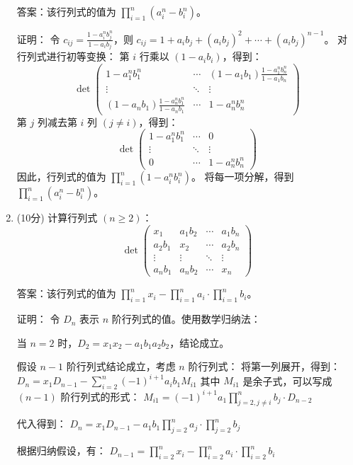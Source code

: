 \documentclass[a4paper,12pt]{article}
\begin{document}
\begin{enumerate}[leftmargin=*]
    答案：该行列式的值为 $\prod_{i=1}^n (a_i^n - b_i^n)$。
    
    证明：
    令 $c_{ij} = \frac{1-a_i^nb_j^n}{1-a_ib_j}$，则 $c_{ij} = 1 + a_ib_j + (a_ib_j)^2 + \cdots + (a_ib_j)^{n-1}$。
    对行列式进行初等变换：
    第 $i$ 行乘以 $(1-a_ib_i)$，得到：
    \[
    \det\begin{pmatrix}
    1-a_1^nb_1^n & \cdots & (1-a_1b_1)\frac{1-a_1^nb_n^n}{1-a_1b_n} \\
    \vdots & \ddots & \vdots \\
    (1-a_nb_1)\frac{1-a_n^nb_1^n}{1-a_nb_1} & \cdots & 1-a_n^nb_n^n
    \end{pmatrix}
    \]
    第 $j$ 列减去第 $i$ 列 $(j \neq i)$，得到：
    \[
    \det\begin{pmatrix}
    1-a_1^nb_1^n & \cdots & 0 \\
    \vdots & \ddots & \vdots \\
    0 & \cdots & 1-a_n^nb_n^n
    \end{pmatrix}
    \]
    因此，行列式的值为 $\prod_{i=1}^n (1-a_i^nb_i^n)$。
    将每一项分解，得到 $\prod_{i=1}^n (a_i^n - b_i^n)$。
    
    \item (10分) 计算行列式 $(n \geq 2)$：
    \[
    \det\begin{pmatrix}
    x_1 & a_1b_2 & \cdots & a_1b_n \\
    a_2b_1 & x_2 & \cdots & a_2b_n \\
    \vdots & \vdots & \ddots & \vdots \\
    a_nb_1 & a_nb_2 & \cdots & x_n
    \end{pmatrix}
    \]
    
    答案：该行列式的值为 $\prod_{i=1}^n x_i - \prod_{i=1}^n a_i \cdot \prod_{i=1}^n b_i$。
    
    证明：
    令 $D_n$ 表示 $n$ 阶行列式的值。使用数学归纳法：
    
    当 $n=2$ 时，$D_2 = x_1x_2 - a_1b_1a_2b_2$，结论成立。
    
    假设 $n-1$ 阶行列式结论成立，考虑 $n$ 阶行列式：
    将第一列展开，得到：
    $D_n = x_1D_{n-1} - \sum_{i=2}^n (-1)^{i+1} a_ib_1 M_{i1}$
    其中 $M_{i1}$ 是余子式，可以写成 $(n-1)$ 阶行列式的形式：
    $M_{i1} = (-1)^{i+1} a_1 \prod_{j=2,j\neq i}^n b_j \cdot D_{n-2}$
    
    代入得到：
    $D_n = x_1D_{n-1} - a_1b_1 \prod_{j=2}^n a_j \cdot \prod_{j=2}^n b_j$
    
    根据归纳假设，有：
    $D_{n-1} = \prod_{i=2}^n x_i - \prod_{i=2}^n a_i \cdot \prod_{i=2}^n b_i$
    

\end{enumerate}
\end{document}
